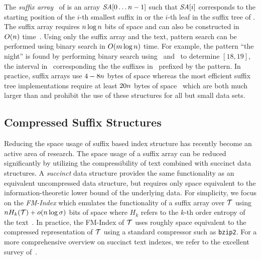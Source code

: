 The {\it suffix array}~\cite{mm-jcomp93} of {\col} is an array $\mbox{\emph{SA}}[0\ldots n-1]$ such
that $\mbox{\emph{SA}}[i]$ corresponds to the starting position of the $i$-th smallest suffix
in {\col} or the $i$-th leaf in the suffix tree of {\col}. The suffix array requires
$n \log n$ bits of space and can also be constructed in $O(n)$ time~\cite{ksb-jacm06}.
Using only the suffix array and the text, pattern search can be performed using binary search
in $O(m \log n)$ time. For example, the pattern ``the night'' is found by performing
binary search using \SA\ and \col\ to determine \SA$[18,19]$, the interval in 
\SA\ corresponding the the suffixes in \col\ prefixed by the pattern.
In practice, suffix arrays use $4-8n$ bytes of space whereas the most efficient
suffix tree implementations require at least $20n$ bytes of space~\cite{k-spe99} which
are both much larger than {\col} and prohibit the use of these structures for all but
small data sets.

\subsection{Compressed Suffix Structures}

Reducing the space usage of suffix based index structure has recently become an 
active area of research. The space usage of a suffix array can be reduced 
significantly by utilizing the compressibility of text combined 
with succinct data structures. A {\it succinct} data structure provides the
same functionality as an equivalent uncompressed data structure, but requires
only space equivalent to the information-theoretic lower bound of the underlying
data. For simplicity, we focus on the {\it FM-Index} which emulates the
functionality of a suffix array over $\mathcal{T}$ using $n H_k(\mathcal{T})+o(n \log \sigma)$
bits of space where $H_k$ refers to the $k$-th order entropy of the text~\cite{fmmn-talg07}.
In practice, the FM-Index of $\mathcal{T}$ uses roughly space equivalent to
the compressed representation of $\mathcal{T}$ using a standard compressor such as {\tt bzip2}.
For a more comprehensive overview on succinct text indexes, we refer to the
excellent survey of~.

